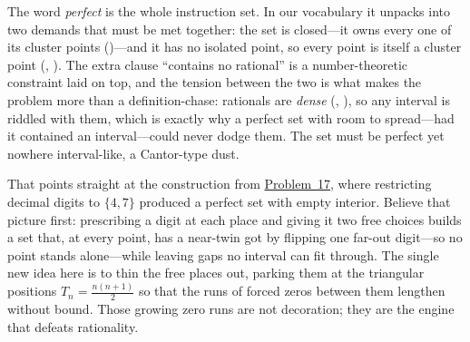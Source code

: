 \documentclass[main.tex]{subfiles}
\begin{document}
\begin{Reflection}
The word \emph{perfect} is the whole instruction set. In our vocabulary it unpacks into two demands that
must be met together: the set is closed---it owns every one of its cluster points ()---and it
has no isolated point, so every point is itself a cluster point (, ). The extra
clause ``contains no rational'' is a number-theoretic constraint laid on top, and the tension between the
two is what makes the problem more than a definition-chase: rationals are \emph{dense}
(, ), so any interval is riddled with
them, which is exactly why a perfect set with room to spread---had it contained an interval---could never
dodge them. The set must be perfect yet nowhere interval-like, a Cantor-type dust.

That points straight at the construction from \hyperlink{prob:17}{Problem~17}, where restricting decimal
digits to $\{4,7\}$ produced a perfect set with empty interior. Believe that picture first: prescribing a
digit at each place and giving it two free choices builds a set that, at every point, has a near-twin got
by flipping one far-out digit---so no point stands alone---while leaving gaps no interval can fit through.
The single new idea here is to thin the free places out, parking them at the triangular positions
$T_n=\tfrac{n(n+1)}2$ so that the runs of forced zeros between them lengthen without bound. Those growing
zero runs are not decoration; they are the engine that defeats rationality.


\end{Reflection}
\end{document}
